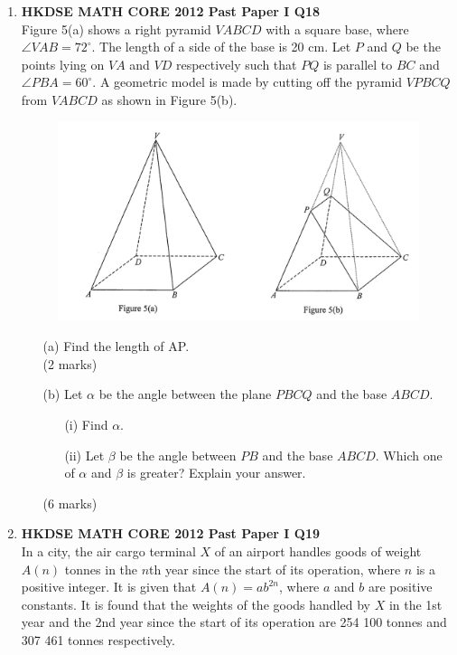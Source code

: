 \documentclass[12pt]{article}
\begin{document}
\begin{enumerate}
	\item \textbf{HKDSE MATH CORE 2012 Past Paper I Q18}\\
	Figure 5(a) shows a right pyramid $VABCD$ with a square base, where $\angle VAB = 72^\circ$. The length of a side of the base is 20 cm. Let $P$ and $Q$ be the points lying on $VA$ and $VD$ respectively such that $PQ$ is parallel to $BC$ and $\angle PBA = 60^\circ$. A geometric model is made by cutting off the pyramid $VPBCQ$ from $VABCD$ as shown in Figure 5(b).
	\begin{figure}[H]
		\centering
		\includegraphics[width = .3\linewidth]{2012Figure1.5}
	\end{figure}
	\begin{enumerate}
		\item[(a)] Find the length of AP. \\(2 marks)
		\item[(b)] Let $\alpha$ be the angle between the plane $PBCQ$ and the base $ABCD$.	
		\begin{enumerate}
			\item[(i)] Find $\alpha$.
			\item[(ii)] Let $\beta$ be the angle between $PB$ and the base $ABCD$. Which one of $\alpha$ and $\beta$ is greater? Explain your answer.	
		\end{enumerate}
		(6 marks)
	\end{enumerate}

	\item \textbf{HKDSE MATH CORE 2012 Past Paper I Q19}\\
	In a city, the air cargo terminal $X$ of an airport handles goods of weight $A(n)$ tonnes in the $n$th year since the start of its operation, where $n$ is a positive integer. It is given that $A(n) = ab^{2n}$, where $a$ and $b$ are positive constants. It is found that the weights of the goods handled by $X$ in the 1st year and the 2nd year since the start of its operation are 254 100 tonnes and 307 461 tonnes respectively.


\end{enumerate}
\end{document}
